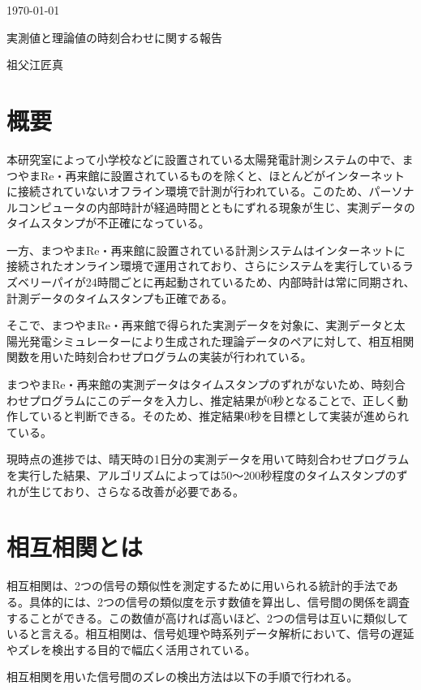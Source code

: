 \documentclass[a4j,12pt,]{jarticle}
\begin{document}
{\noindent\small  \hfill\today}
\begin{center}
  {\Large 実測値と理論値の時刻合わせに関する報告}
\end{center}
\begin{flushright}
  祖父江匠真 \\
\end{flushright}

\section{概要}
本研究室によって小学校などに設置されている太陽発電計測システムの中で、まつやまRe・再来館に設置されているものを除くと、ほとんどがインターネットに接続されていないオフライン環境で計測が行われている。このため、パーソナルコンピュータの内部時計が経過時間とともにずれる現象が生じ、実測データのタイムスタンプが不正確になっている。

一方、まつやまRe・再来館に設置されている計測システムはインターネットに接続されたオンライン環境で運用されており、さらにシステムを実行しているラズベリーパイが24時間ごとに再起動されているため、内部時計は常に同期され、計測データのタイムスタンプも正確である。

そこで、まつやまRe・再来館で得られた実測データを対象に、実測データと太陽光発電シミュレーターにより生成された理論データのペアに対して、相互相関関数を用いた時刻合わせプログラムの実装が行われている。

まつやまRe・再来館の実測データはタイムスタンプのずれがないため、時刻合わせプログラムにこのデータを入力し、推定結果が0秒となることで、正しく動作していると判断できる。そのため、推定結果0秒を目標として実装が進められている。

現時点の進捗では、晴天時の1日分の実測データを用いて時刻合わせプログラムを実行した結果、アルゴリズムによっては50〜200秒程度のタイムスタンプのずれが生じており、さらなる改善が必要である。

\section{相互相関とは}
相互相関は、2つの信号の類似性を測定するために用いられる統計的手法である。具体的には、2つの信号の類似度を示す数値を算出し、信号間の関係を調査することができる。この数値が高ければ高いほど、2つの信号は互いに類似していると言える。相互相関は、信号処理や時系列データ解析において、信号の遅延やズレを検出する目的で幅広く活用されている。

相互相関を用いた信号間のズレの検出方法は以下の手順で行われる。
\end{document}
